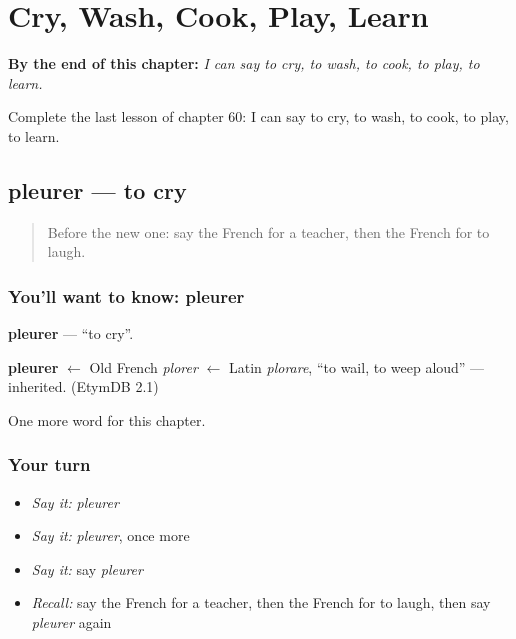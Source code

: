 
\chapter{Cry, Wash, Cook, Play, Learn}
\label{ch:fr-cry-wash-cook-play-learn}

\begin{chapteropening}
\textbf{By the end of this chapter:} \emph{I can say to cry, to wash, to cook, to play, to learn.}

Complete the last lesson of chapter 60: I can say to cry, to wash, to cook, to play, to learn.
\end{chapteropening}

\section[pleurer]{pleurer — to cry}

\label{lesson:FR-C60-pleurer}



\begin{quote}
Before the new one: say the French for a teacher, then the French for to laugh.
\end{quote}

\subsection*{You'll want to know: pleurer}
\textbf{pleurer} — \textquotedblleft{}to cry\textquotedblright{}.

\begin{cousinweb}
\textbf{pleurer} $\leftarrow$ Old French \emph{plorer} $\leftarrow$ Latin \emph{plorare}, \textquotedblleft{}to wail, to weep aloud\textquotedblright{} — inherited. (EtymDB 2.1)
\end{cousinweb}

\begin{grammarlens}[title={What you've built}]
One more word for this chapter.
\end{grammarlens}

\subsection*{Your turn}
\begin{itemize}
\raggedright
  \item \emph{Say it:} \emph{pleurer}
  \item \emph{Say it:} \emph{pleurer}, once more
  \item \emph{Say it:} say \emph{pleurer}
  \item \emph{Recall:} say the French for a teacher, then the French for to laugh, then say \emph{pleurer} again
\end{itemize}

